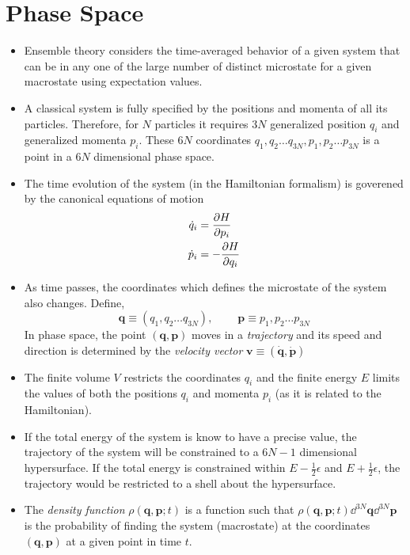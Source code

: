 \documentclass{article}
\newcommand{\smallspace}{\:\:\:\:\:\:\:\:\:\:}
\newcommand{\ve}{\mathbf}
\begin{document}
\section{Phase Space}
\begin{itemize}
    \item Ensemble theory considers the time-averaged behavior of a given system that can be in any one of the large number of distinct microstate for a given macrostate using expectation values.
    \item A classical system is fully specified by the positions and momenta of all its particles. Therefore, for $N$ particles it requires $3N$ generalized position $q_i$ and generalized momenta $p_i$. These $6N$ coordinates $q_1,q_2\dots q_{3N},p_1,p_2\dots p_{3N}$ is a point in a $6N$ dimensional phase space.
    \item The time evolution of the system (in the Hamiltonian formalism) is goverened by the canonical equations of motion 
    \begin{align}
        \dot q_i&=\partialderivative{H}{p_i}\label{position}\\
        \dot p_i&=-\partialderivative{H}{q_i}\label{momentum}
    \end{align}
    \item As time passes, the coordinates which defines the microstate of the system also changes. Define,
    \begin{equation}
        \ve q\equiv (q_1,q_2\dots q_{3N}),\smallspace \ve p\equiv p_1,p_2\dots p_{3N}
    \end{equation}
    In phase space, the point $(\ve q,\ve p)$ moves in a \textit{trajectory} and its speed and direction is determined by the \textit{velocity vector} $\mathbf{v}\equiv (\dot{\ve q},\dot{\ve p})$
    \item The finite volume $V$ restricts the coordinates $q_i$ and the finite energy $E$ limits the values of both the positions $q_i$ and momenta $p_i$ (as it is related to the Hamiltonian).
    \item If the total energy of the system is know to have a precise value, the trajectory of the system will be constrained to a $6N-1$ dimensional hypersurface. If the total energy is constrained within $E-\frac{1}{2}\epsilon$ and $E+\frac{1}{2}\epsilon$, the trajectory would be restricted to a shell about the hypersurface.
    \item The \textit{density function} $\rho(\ve q,\ve p;t)$ is a function such that $\rho(\ve q,\ve p;t)\dd^{3N}\ve q\dd^{3N}\ve p$ is the probability of finding the system (macrostate) at the coordinates $(\ve q,\ve p)$ at a given point in time $t$. 

\end{itemize}
\end{document}
